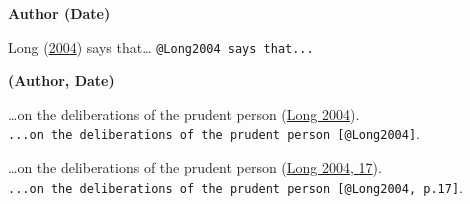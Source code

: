 \documentclass[
  12pt,
  a4paper,
  oneside,
  titlepage,
  toclink=all,
  toc=bibliography]{scrbook}
\theoremstyle{definition}
\theoremstyle{plain}
\theoremstyle{plain}
\theoremstyle{plain}
\theoremstyle{plain}
\theoremstyle{definition}
\theoremstyle{definition}
\theoremstyle{plain}
\theoremstyle{remark}
\begin{document}
\begin{tcolorbox}[enhanced jigsaw, left=2mm, colframe=quarto-callout-note-color-frame, colback=white, opacityback=0, breakable, toprule=.15mm, arc=.35mm, rightrule=.15mm, bottomrule=.15mm, leftrule=.75mm]
\begin{minipage}[t]{5.5mm}
\textcolor{quarto-callout-note-color}{\faInfo}
\end{minipage}%
\begin{minipage}[t]{\textwidth - 5.5mm}

\textbf{Author (Date)}\vspace{2mm}

\protect\hypertarget{cite_87}{}{\label{cite_87}Long
(\protect\hyperlink{ref-Long2004}{2004})} says that\ldots{}
\texttt{@Long2004\ says\ that...}

\end{minipage}%
\end{tcolorbox}

\begin{tcolorbox}[enhanced jigsaw, left=2mm, colframe=quarto-callout-note-color-frame, colback=white, opacityback=0, breakable, toprule=.15mm, arc=.35mm, rightrule=.15mm, bottomrule=.15mm, leftrule=.75mm]
\begin{minipage}[t]{5.5mm}
\textcolor{quarto-callout-note-color}{\faInfo}
\end{minipage}%
\begin{minipage}[t]{\textwidth - 5.5mm}

\textbf{(Author, Date)}\vspace{2mm}

\ldots on the deliberations of the prudent person
\protect\hypertarget{cite_88}{}{\label{cite_88}(\protect\hyperlink{ref-Long2004}{Long
2004})}.
\texttt{...on\ the\ deliberations\ of\ the\ prudent\ person\ {[}@Long2004{]}}.

\ldots on the deliberations of the prudent person
\protect\hypertarget{cite_89}{}{\label{cite_89}(\protect\hyperlink{ref-Long2004}{Long
2004, 17})}.
\texttt{...on\ the\ deliberations\ of\ the\ prudent\ person\ {[}@Long2004,\ p.17{]}}.

\end{minipage}%
\end{tcolorbox}
\end{document}
